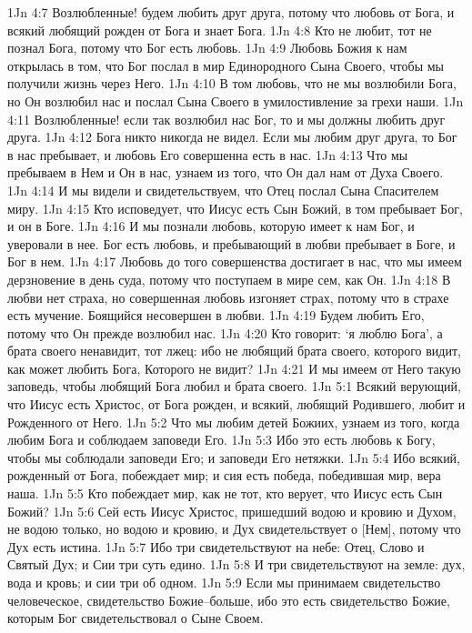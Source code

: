 1Jn 4:7  Возлюбленные! будем любить друг друга, потому что любовь от Бога, и всякий любящий рожден от Бога и знает Бога.
1Jn 4:8  Кто не любит, тот не познал Бога, потому что Бог есть любовь.
1Jn 4:9  Любовь Божия к нам открылась в том, что Бог послал в мир Единородного Сына Своего, чтобы мы получили жизнь через Него.
1Jn 4:10  В том любовь, что не мы возлюбили Бога, но Он возлюбил нас и послал Сына Своего в умилостивление за грехи наши.
1Jn 4:11  Возлюбленные! если так возлюбил нас Бог, то и мы должны любить друг друга.
1Jn 4:12  Бога никто никогда не видел. Если мы любим друг друга, то Бог в нас пребывает, и любовь Его совершенна есть в нас.
1Jn 4:13  Что мы пребываем в Нем и Он в нас, узнаем из того, что Он дал нам от Духа Своего.
1Jn 4:14  И мы видели и свидетельствуем, что Отец послал Сына Спасителем миру.
1Jn 4:15  Кто исповедует, что Иисус есть Сын Божий, в том пребывает Бог, и он в Боге.
1Jn 4:16  И мы познали любовь, которую имеет к нам Бог, и уверовали в нее. Бог есть любовь, и пребывающий в любви пребывает в Боге, и Бог в нем.
1Jn 4:17  Любовь до того совершенства достигает в нас, что мы имеем дерзновение в день суда, потому что поступаем в мире сем, как Он.
1Jn 4:18  В любви нет страха, но совершенная любовь изгоняет страх, потому что в страхе есть мучение. Боящийся несовершен в любви.
1Jn 4:19  Будем любить Его, потому что Он прежде возлюбил нас.
1Jn 4:20  Кто говорит: `я люблю Бога', а брата своего ненавидит, тот лжец: ибо не любящий брата своего, которого видит, как может любить Бога, Которого не видит?
1Jn 4:21  И мы имеем от Него такую заповедь, чтобы любящий Бога любил и брата своего.
1Jn 5:1  Всякий верующий, что Иисус есть Христос, от Бога рожден, и всякий, любящий Родившего, любит и Рожденного от Него.
1Jn 5:2  Что мы любим детей Божиих, узнаем из того, когда любим Бога и соблюдаем заповеди Его.
1Jn 5:3  Ибо это есть любовь к Богу, чтобы мы соблюдали заповеди Его; и заповеди Его нетяжки.
1Jn 5:4  Ибо всякий, рожденный от Бога, побеждает мир; и сия есть победа, победившая мир, вера наша.
1Jn 5:5  Кто побеждает мир, как не тот, кто верует, что Иисус есть Сын Божий?
1Jn 5:6  Сей есть Иисус Христос, пришедший водою и кровию и Духом, не водою только, но водою и кровию, и Дух свидетельствует о [Нем], потому что Дух есть истина.
1Jn 5:7  Ибо три свидетельствуют на небе: Отец, Слово и Святый Дух; и Сии три суть едино.
1Jn 5:8  И три свидетельствуют на земле: дух, вода и кровь; и сии три об одном.
1Jn 5:9  Если мы принимаем свидетельство человеческое, свидетельство Божие--больше, ибо это есть свидетельство Божие, которым Бог свидетельствовал о Сыне Своем.

